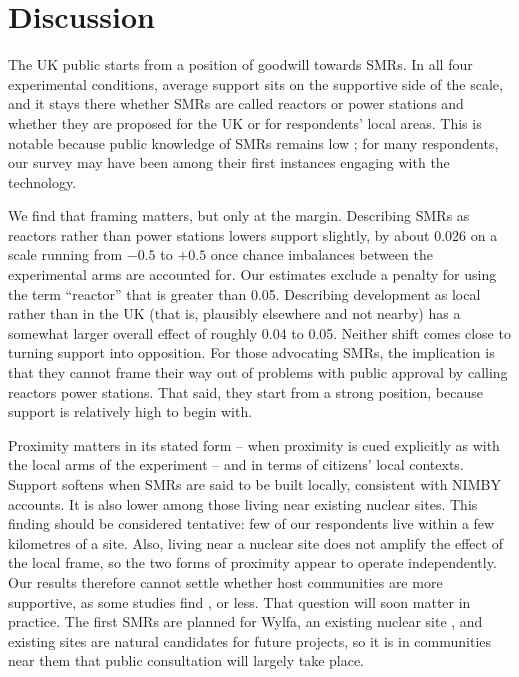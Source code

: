\documentclass[a4paper, 11pt]{article}
\begin{document}
\section*{Discussion}
The UK public starts from a position of goodwill towards SMRs. In all four experimental conditions, average support sits on the supportive side of the scale, and it stays there whether SMRs are called reactors or power stations and whether they are proposed for the UK or for respondents' local areas. This is notable because public knowledge of SMRs remains low \citep{durdovic2025,jones2026}; for many respondents, our survey may have been among their first instances engaging with the technology.

We find that framing matters, but only at the margin. Describing SMRs as reactors rather than power stations lowers support slightly, by about 0.026 on a scale running from $-0.5$ to $+0.5$ once chance imbalances between the experimental arms are accounted for. Our estimates exclude a penalty for using the term ``reactor'' that is greater than 0.05. Describing development as local rather than in the UK (that is, plausibly elsewhere and not nearby) has a somewhat larger overall effect of roughly 0.04 to 0.05. Neither shift comes close to turning support into opposition. For those advocating SMRs, the implication is that they cannot frame their way out of problems with public approval by calling reactors power stations. That said, they start from a strong position, because support is relatively high to begin with.

Proximity matters in its stated form -- when proximity is cued explicitly as with the local arms of the experiment -- and in terms of citizens' local contexts. Support softens when SMRs are said to be built locally, consistent with NIMBY accounts. It is also lower among those living near existing nuclear sites. This finding should be considered tentative: few of our respondents live within a few kilometres of a site. Also, living near a nuclear site does not amplify the effect of the local frame, so the two forms of proximity appear to operate independently. Our results therefore cannot settle whether host communities are more supportive, as some studies find \citep{greenberg2009,mcbeth2023,venables2012}, or less. That question will soon matter in practice. The first SMRs are planned for Wylfa, an existing nuclear site \citep{sutton2025}, and existing sites are natural candidates for future projects, so it is in communities near them that public consultation will largely take place.
\end{document}
